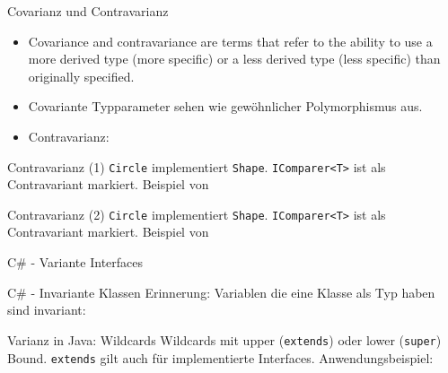 \documentclass[11pt]{beamer}
\begin{document}
\begin{frame}{Covarianz und Contravarianz}
	\begin{itemize}
		\item \glqq Covariance and contravariance are terms that refer to the ability to use a more derived type (more specific) or a less derived type (less specific) than originally specified.\grqq{} \cite{csharp_docs_variance}
		\item Covariante Typparameter  sehen wie \glqq gewöhnlicher\grqq{} Polymorphismus aus.
		\item Contravarianz:
	\end{itemize}

\end{frame}

\begin{frame}{Contravarianz (1)}
\tiny{
\texttt{Circle} implementiert \texttt{Shape}. \texttt{IComparer<T>} ist als Contravariant markiert.}
Beispiel von \cite{csharp_example_contravariance}
\end{frame}

\begin{frame}{Contravarianz (2)}
\tiny{
\texttt{Circle} implementiert \texttt{Shape}. \texttt{IComparer<T>} ist als Contravariant markiert.}
Beispiel von \cite{csharp_example_contravariance}
\end{frame}


\begin{frame}{C\# - Variante Interfaces}
\end{frame}


\begin{frame}{C\# - Invariante Klassen}
	Erinnerung: 
	Variablen die eine Klasse als Typ haben sind invariant:
\end{frame}

\begin{frame}{Varianz in Java: Wildcards}
		Wildcards mit upper (\texttt{extends}) oder lower (\texttt{super}) Bound. \texttt{extends} gilt auch für implementierte Interfaces.
		Anwendungsbeispiel:
\end{frame}
\end{document}
